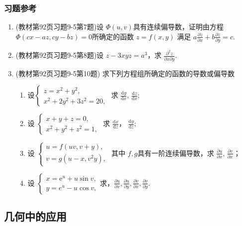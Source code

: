 \subsubsection{习题参考}
\begin{enumerate}
    \item (教材第92页习题9-5第7题)设 $\Phi(u,v)$具有连续偏导数，证明由方程 $\Phi (cx-az , cy - bz) =0 $所确定的函数 $z = f(x,y)$ 满足 $a \frac{\partial z }{\partial x} + b \frac{\partial z}{\partial y}=c$.

    \item (教材第92页习题9-5第8题)设 $z -3 x y z = a^3$，求 $\frac{\partial ^2 z}{\partial x \partial y}$.

    \item (教材第92页习题9-5第10题) 求下列方程组所确定的函数的导数或偏导数
    \begin{enumerate}[(1)]
        \item 设$\begin{cases} z = x^2 + y^2,\\ x^2 + 2 y^2 + 3z^2 = 20, \end{cases}$ 求 $\frac{\mathrm{d} y }{\mathrm{d}x}$, $\frac{\mathrm{d} z}{\mathrm{d} x}$;
        \item 设 $\begin{cases}
            x+ y + z = 0, \\
            x^2 + y^2 + z^2 =1,
        \end{cases}$
        求 $\frac{\mathrm{d} x}{\mathrm{d} z}$， $\frac{\mathrm{d} y }{\mathrm{d}z}$;
        \item 设 $\begin{cases}
            u = f(uv,v+y), \\
            v = g(u-x,v^2 y),
        \end{cases}$
        其中 $f,g$具有一阶连续偏导数，求 $\frac{\partial u }{\partial x}$, $\frac{\partial v }{\partial x}$；
        \item 设 $\begin{cases}
            x = \mathrm{e}^u + u \sin v , \\
            y = e^u - u \cos v,
        \end{cases}
        $求，$\frac{\partial u}{\partial x}, \frac{\partial u}{\partial y}, \frac{\partial v}{\partial x}, \frac{\partial v}{\partial y}$.
    \end{enumerate}
\end{enumerate}

\subsection{几何中的应用}
